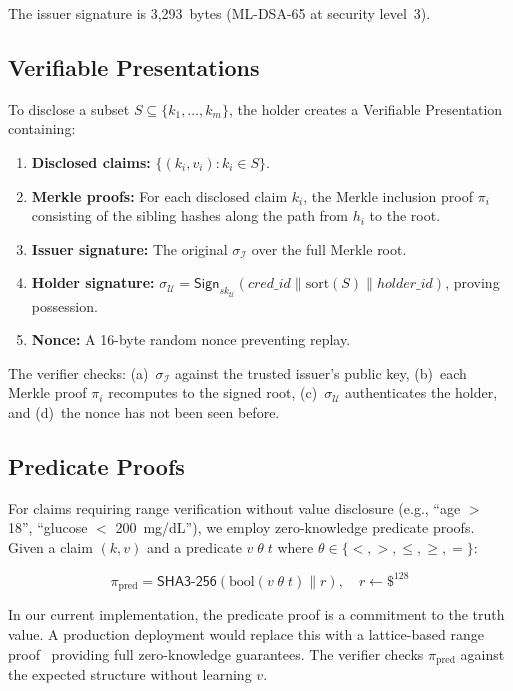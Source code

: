 \documentclass[conference,10pt]{IEEEtran}
\newcommand{\shaiii}{\textsf{SHA3-256}}
\newcommand{\Sign}{\mathsf{Sign}}
\begin{document}
The issuer signature is 3{,}293~bytes (ML-DSA-65 at security level~3).

\subsection{Verifiable Presentations}

To disclose a subset $S \subseteq \{k_1, \ldots, k_m\}$, the holder creates a Verifiable Presentation containing:

\begin{enumerate}[leftmargin=*]
    \item \textbf{Disclosed claims:} $\{(k_i, v_i) : k_i \in S\}$.
    \item \textbf{Merkle proofs:} For each disclosed claim $k_i$, the Merkle inclusion proof $\pi_i$ consisting of the sibling hashes along the path from $h_i$ to the root.
    \item \textbf{Issuer signature:} The original $\sigma_{\mathcal{I}}$ over the full Merkle root.
    \item \textbf{Holder signature:} $\sigma_{\mathcal{U}} = \Sign_{\mathit{sk}_\mathcal{U}}(\mathit{cred\_id} \| \text{sort}(S) \| \mathit{holder\_id})$, proving possession.
    \item \textbf{Nonce:} A 16-byte random nonce preventing replay.
\end{enumerate}

The verifier checks: (a)~$\sigma_{\mathcal{I}}$ against the trusted issuer's public key, (b)~each Merkle proof $\pi_i$ recomputes to the signed root, (c)~$\sigma_{\mathcal{U}}$ authenticates the holder, and (d)~the nonce has not been seen before.

\subsection{Predicate Proofs}

For claims requiring range verification without value disclosure (e.g., ``age $>$ 18'', ``glucose $<$ 200~mg/dL''), we employ zero-knowledge predicate proofs. Given a claim $(k, v)$ and a predicate $v \; \theta \; t$ where $\theta \in \{<, >, \leq, \geq, =\}$:

\begin{equation}
\pi_{\text{pred}} = \shaiii{}(\text{bool}(v \; \theta \; t) \| r), \quad r \leftarrow \$^{128}
\end{equation}

In our current implementation, the predicate proof is a commitment to the truth value. A production deployment would replace this with a lattice-based range proof~\cite{yang2022pqzkp} providing full zero-knowledge guarantees. The verifier checks $\pi_{\text{pred}}$ against the expected structure without learning $v$.
\end{document}
